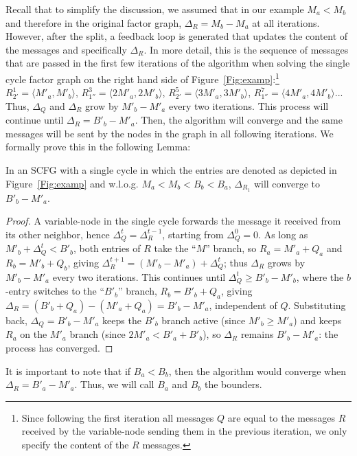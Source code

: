 Recall that to simplify the discussion, we assumed that in our example $M_a < M_b$ and therefore in the original factor graph, $\Delta_R = M_b - M_a$ at all iterations.
However, after the split, a feedback loop is generated that updates the content of the messages and specifically $\Delta_R$.
In more detail, this is the sequence of messages that are passed in the first few iterations of the algorithm when solving the single cycle factor graph on the right hand side of Figure~\ref{Fig:examp}:\footnote{Since following the first iteration all messages $Q$ are equal to the messages $R$ received by the variable-node sending them in the previous iteration, we only specify the content of the $R$ messages.} $R^1_{2'} = \langle M'_a,M'_b\rangle$, $R^3_{1''} = \langle 2M'_a,2M'_b\rangle$, $R^5_{2'} = \langle 3M'_a,3M'_b\rangle$,  $R^7_{1''} = \langle 4M'_a,4M'_b\rangle$...
Thus, $\Delta_Q$ and $\Delta_R$ grow by $M'_b - M'_a$ every two iterations. This process will continue until $\Delta_R = B'_b - M'_a$. Then, the algorithm will converge and the same messages will be sent by the nodes in the graph in all following iterations. We formally prove this in the following Lemma:
\begin{lemma}\label{lem:singlecycle}
    In an SCFG with a single cycle in which the entries are denoted as depicted in Figure~\ref{Fig:examp} and w.l.o.g. $M_a < M_b < B_b < B_a$, $\Delta_{R_1}$ will converge to $B'_b - M'_a$.
\end{lemma}
\begin{proof}
    A variable-node in the single cycle forwards the message it received from its other neighbor, hence $\Delta^{t}_Q = \Delta^{t-1}_R$, starting from $\Delta^0_Q = 0$. As long as $M'_b + \Delta^t_Q < B'_b$, both entries of $R$ take the ``$M$'' branch, so $R_a = M'_a + Q_a$ and $R_b = M'_b + Q_b$, giving $\Delta^{t+1}_R = (M'_b - M'_a) + \Delta^t_Q$; thus $\Delta_R$ grows by $M'_b - M'_a$ every two iterations. This continues until $\Delta^t_Q \geq B'_b - M'_b$, where the $b$-entry switches to the ``$B'_b$'' branch, $R_b = B'_b + Q_a$, giving $\Delta_R = (B'_b + Q_a) - (M'_a + Q_a) = B'_b - M'_a$, independent of $Q$. Substituting back, $\Delta_Q = B'_b - M'_a$ keeps the $B'_b$ branch active (since $M'_b \geq M'_a$) and keeps $R_a$ on the $M'_a$ branch (since $2M'_a < B'_a + B'_b$), so $\Delta_R$ remains $B'_b - M'_a$: the process has converged.
\end{proof}
It is important to note that if $B_a < B_b$, then the algorithm would converge when $\Delta_R = B'_a - M'_a$. Thus, we will call $B_a$ and $B_b$ the bounders.
